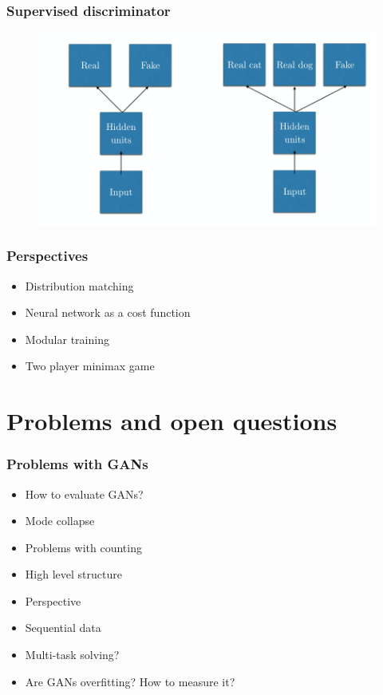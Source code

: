 \documentclass{Bredelebeamer}
\begin{document}
\begin{frame}
	\frametitle{Supervised discriminator}
	\begin{figure}[h!]
	\centering
	\includegraphics[width=\textwidth]{supervised_discriminator.png}
	\end{figure}
\end{frame}
\begin{frame}
\frametitle{Perspectives}
\begin{itemize}
	\item Distribution matching
	\item Neural network as a cost function
	\item Modular training
	\item Two player minimax game
\end{itemize}
\end{frame}


\section{Problems and open questions}
\begin{frame}
	\frametitle{Problems with GANs}
	\begin{itemize}
		\item How to evaluate GANs?
		\item Mode collapse
		\item Problems with counting
		\item High level structure
		\item Perspective
		\item Sequential data
		\item Multi-task solving?
		\item Are GANs overfitting? How to measure it?
	\end{itemize}
\end{frame}
\end{document}
